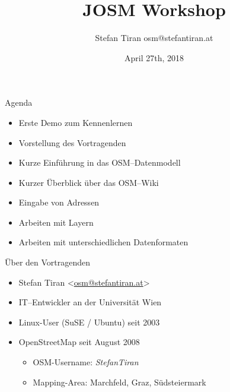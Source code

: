 \documentclass{beamer}
\title{JOSM Workshop}
\author{Stefan Tiran  osm@stefantiran.at}
\date{April 27th, 2018}
\begin{document}
\begin{frame}{Agenda}
  \begin{itemize}
    \item Erste Demo zum Kennenlernen
    \item Vorstellung des Vortragenden
    \item Kurze Einführung in das OSM--Datenmodell
    \item Kurzer Überblick über das OSM--Wiki
    \item Eingabe von Adressen
    \item Arbeiten mit Layern
    \item Arbeiten mit unterschiedlichen Datenformaten

  \end{itemize}
\end{frame}

\begin{frame}{Über den Vortragenden}

  \begin{itemize}
    \item Stefan Tiran \textless \href{mailto:osm@stefantiran.at}{osm@stefantiran.at}\textgreater
    \item IT--Entwickler an der Universität Wien
    \item Linux-User (SuSE / Ubuntu) seit 2003
    \item OpenStreetMap seit August 2008
    \begin{itemize}
      \item OSM-Username: \emph{StefanTiran}
      \item Mapping-Area: Marchfeld, Graz, Südsteiermark
    \end{itemize}
  \end{itemize}
\end{frame}
\end{document}
